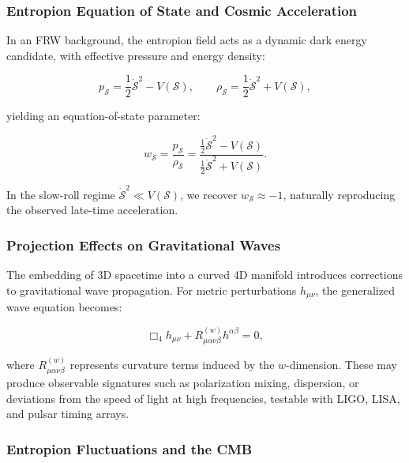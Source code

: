\documentclass[12pt]{article}
\begin{document}
\subsubsection*{Entropion Equation of State and Cosmic Acceleration}

In an FRW background, the entropion field acts as a dynamic dark energy candidate, with effective pressure and energy density:

\begin{equation}
p_{\mathcal{S}} = \frac{1}{2} \dot{\mathcal{S}}^2 - V(\mathcal{S}), \qquad
\rho_{\mathcal{S}} = \frac{1}{2} \dot{\mathcal{S}}^2 + V(\mathcal{S}),
\label{eq:entropion_pressure_density}
\end{equation}

yielding an equation-of-state parameter:

\begin{equation}
w_{\mathcal{S}} = \frac{p_{\mathcal{S}}}{\rho_{\mathcal{S}}} = \frac{\frac{1}{2} \dot{\mathcal{S}}^2 - V(\mathcal{S})}{\frac{1}{2} \dot{\mathcal{S}}^2 + V(\mathcal{S})}.
\label{eq:entropion_eos}
\end{equation}

In the slow-roll regime $\dot{\mathcal{S}}^2 \ll V(\mathcal{S})$, we recover $w_{\mathcal{S}} \approx -1$, naturally reproducing the observed late-time acceleration.

\subsubsection*{Projection Effects on Gravitational Waves}

The embedding of 3D spacetime into a curved 4D manifold introduces corrections to gravitational wave propagation. For metric perturbations $h_{\mu\nu}$, the generalized wave equation becomes:

\begin{equation}
\Box_4 h_{\mu\nu} + R^{(w)}_{\mu\alpha\nu\beta} h^{\alpha\beta} = 0,
\label{eq:gw_projection}
\end{equation}

where $R^{(w)}_{\mu\alpha\nu\beta}$ represents curvature terms induced by the $w$-dimension. These may produce observable signatures such as polarization mixing, dispersion, or deviations from the speed of light at high frequencies, testable with LIGO, LISA, and pulsar timing arrays.

\subsubsection*{Entropion Fluctuations and the CMB}
\end{document}
